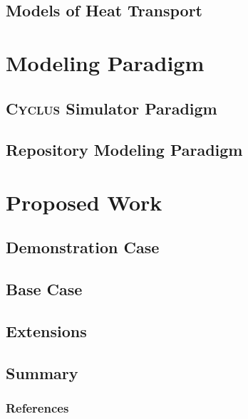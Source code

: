 \documentclass[9pt]{beamer}
\begin{document}
\subsection{Models of Heat Transport}

\section{Modeling Paradigm}
\subsection{\textsc{Cyclus} Simulator Paradigm}

\subsection{Repository Modeling Paradigm}

\section{Proposed Work}
\subsection{Demonstration Case}

\subsection{Base Case}

\subsection{Extensions}

\subsection{Summary}



\begin{frame}[allowframebreaks]
  \frametitle{References}
  
  {\footnotesize  }
\end{frame}
\end{document}
